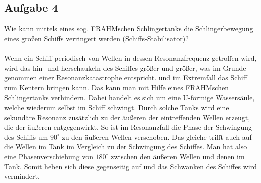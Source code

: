 \documentclass[a4paper,10pt]{scrartcl}
\begin{document}
		\subsection{Aufgabe 4}
			Wie kann mittels eines sog. FRAHMschen Schlingertanks die Schlingerbewegung eines großen
			Schiffs verringert werden (Schiffs-Stabilisator)?\\
			\\
			Wenn ein Schiff periodisch von Wellen in dessen Resonanzfrequenz getroffen wird, wird das hin- und herschaukeln des Schiffes größer und größer, was im Grunde genommen einer Resonanzkatastrophe entspricht. und im Extremfall das Schiff zum Kentern bringen kann. Das kann man mit Hilfe eines FRAHMschen Schlingertanks verhindern. Dabei handelt es sich um eine U-förmige Wassersäule, welche wiederum selbst im Schiff schwingt. Durch solche Tanks wird eine sekundäre Resonanz zusätzlich zu der äußeren der eintreffenden Wellen erzeugt, die der äußeren entgegenwirkt. So ist im Resonanzfall die Phase der Schwingung des Schiffs um \(90^{\circ}\) zu den äußeren Wellen verschoben. Das gleiche trifft auch auf die Wellen im Tank im Vergleich zu der Schwingung des Schiffes. Man hat also eine Phasenverschiebung von \(180^{\circ}\) zwischen den äußeren Wellen und denen im Tank. Somit heben sich diese gegenseitig auf und das Schwanken des Schiffes wird vermindert.
\end{document}
